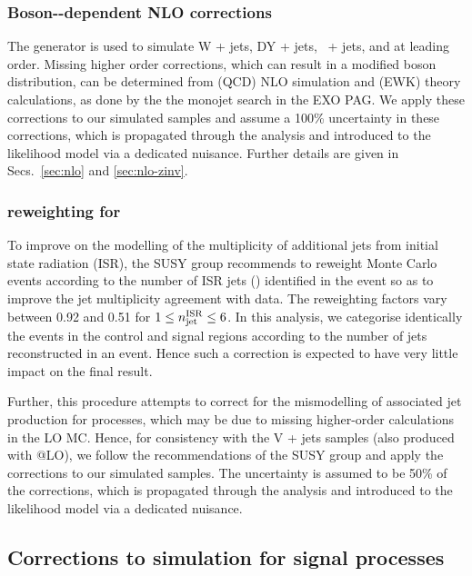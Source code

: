 \subsubsection{Boson-\texorpdfstring{\Pt}{pT}-dependent NLO corrections}
\label{sec:nlo-intro}

The \MADGRAPH generator is used to simulate W + jets, DY + jets,
\znunu\ + jets, and \gj at leading order. Missing higher order
corrections, which can result in a modified boson \Pt distribution,
can be determined from (QCD) NLO simulation and (EWK) theory
calculations, as done by the the monojet search in the EXO PAG. We
apply these corrections to our simulated samples and assume a 100\%
uncertainty in these corrections, which is propagated through the
analysis and introduced to the likelihood model via a dedicated
nuisance. Further details are given in Secs.~\ref{sec:nlo} and
\ref{sec:nlo-zinv}.

\subsubsection{\texorpdfstring{\nisr}{Nisr} reweighting for \texorpdfstring{\ttbar}{TTbar}}
\label{sec:nisr-intro}
 
To improve on the \MADGRAPH modelling of the multiplicity of
additional jets from initial state radiation (ISR), the SUSY group
recommends to reweight \MADGRAPH \ttbar Monte Carlo events according
to the number of ISR jets (\nisr) identified in the event so as to
improve the jet multiplicity agreement with data. The reweighting
factors vary between 0.92 and 0.51 for $1 \leq n_\textrm{jet}^\mathrm{ISR} \leq 6$. In this
analysis, we categorise identically the events in the control and
signal regions according to the number of jets reconstructed in an
event. Hence such a correction is expected to have very little impact
on the final result.

Further, this procedure attempts to correct for the mismodelling of
associated jet production for \ttbar processes, which may be due to
missing higher-order calculations in the LO \MADGRAPH MC. Hence, for
consistency with the V + jets samples (also produced with
\MADGRAPH{}@LO), we follow the recommendations of the SUSY group and
apply the \nisr corrections to our simulated samples. The uncertainty
is assumed to be 50\% of the corrections, which is propagated through
the analysis and introduced to the likelihood model via a dedicated
nuisance.

\subsection{Corrections to simulation for signal processes}


